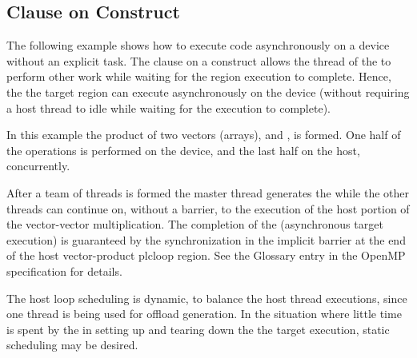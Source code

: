 \subsection{ Clause on  Construct}
\label{subsec:target_nowait_clause}

The following example shows how to execute code asynchronously on a 
device without an explicit task. The  clause on a  
construct allows the thread of the  to perform other
work while waiting for the  region execution to complete. 
Hence, the the target region can execute asynchronously on the 
device (without requiring a host thread to idle while waiting for 
the  execution to complete).

In this example the product of two vectors (arrays), 
and , is formed. One half of the operations is performed
on the device, and the last half on the host, concurrently.

After a team of threads is formed the master thread generates 
the  while the other threads can continue on, without a barrier,
to the execution of the host portion of the vector-vector multiplication.
The completion of the  (asynchronous target execution) is 
guaranteed by the synchronization in the implicit barrier at the end of the 
host vector-product plc{loop} region. See the  
Glossary entry in the OpenMP specification for details.

The host loop scheduling is dynamic, to balance the host thread executions, since 
one thread is being used for offload generation. In the situation where 
little time is spent by the  in setting 
up and tearing down the the target execution, static scheduling may be desired. 


